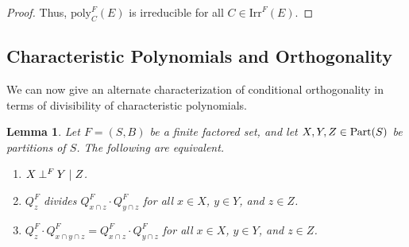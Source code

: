 \documentclass[authordate,onecolumn]{miri-tech-article}
\newtheorem{lemma2}{Lemma}
\begin{document}
\begin{proof}
Thus, $\text{poly}^F_C(E)$ is irreducible for all $C\in \text{Irr}^F(E)$.
\end{proof}

\subsection{Characteristic Polynomials and Orthogonality}
We can now give an alternate characterization of conditional orthogonality in terms of divisibility of characteristic polynomials.
\begin{lemma2}\label{CPO}
Let $F=(S,B)$ be a finite factored set, and let $X,Y,Z\in \text{Part}(S)$ be partitions of $S$. The following are equivalent.
\begin{enumerate}
    \item $X\mathbin{\perp^{F}}Y\mid Z$.
    \item $Q^F_{z}$ divides $Q^F_{x\cap z} \cdot Q^F_{y\cap z}$ for all $x\in X$, $y\in Y$, and $z\in Z$.
    \item $Q^F_{z} \cdot Q^F_{x\cap y\cap z}=Q^F_{x\cap z} \cdot Q^F_{y\cap z}$ for all $x\in X$, $y\in Y$, and $z\in Z$.
\end{enumerate}
\end{lemma2}
\end{document}
